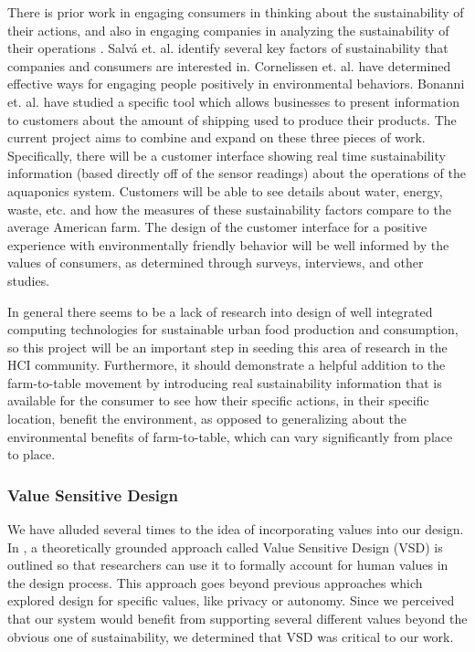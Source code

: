 \documentclass{sigchi}
\begin{document}
There is prior work \cite{smallBusiness, cueing} in engaging consumers in thinking about the sustainability of their actions, and also in engaging companies in analyzing the sustainability of their operations \cite{smallBusiness, audit}. Salv\'a et. al. identify several key factors of sustainability that companies and consumers are interested in. Cornelissen et. al. have determined effective ways for engaging people positively in environmental behaviors. Bonanni et. al. have studied a specific tool which allows businesses to present information to customers about the amount of shipping used to produce their products. The current project aims to combine and expand on these three pieces of work. Specifically, there will be a customer interface showing real time sustainability information (based directly off of the sensor readings) about the operations of the aquaponics system. Customers will be able to see details about water, energy, waste, etc. and how the measures of these sustainability factors compare to the average American farm. The design of the customer interface for a positive experience with environmentally friendly behavior will be well informed by the values of consumers, as determined through surveys, interviews, and other studies. 

In general there seems to be a lack of research into design of well integrated computing technologies for sustainable urban food production and consumption, so this project will be an important step in seeding this area of research in the HCI community. Furthermore, it should demonstrate a helpful addition to the farm-to-table movement by introducing real sustainability information that is available for the consumer to see how their specific actions, in their specific location, benefit the environment, as opposed to generalizing about the environmental benefits of farm-to-table, which can vary significantly from place to place.

\subsubsection{Value Sensitive Design}
We have alluded several times to the idea of incorporating values into our design. In \cite{VSD}, a theoretically grounded approach called Value Sensitive Design (VSD) is outlined so that researchers can use it to formally account for human values in the design process. This approach goes beyond previous approaches which explored design for specific values, like privacy or autonomy. Since we perceived that our system would benefit from supporting several  different values beyond the obvious one of sustainability, we determined that VSD was critical to our work. 
\end{document}
